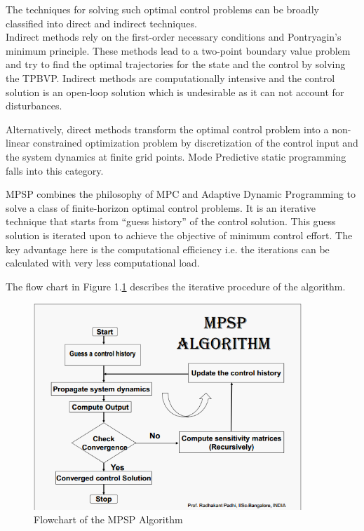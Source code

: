 \documentclass[12pt]{article}
\begin{document}
The techniques for solving such optimal control problems can be broadly classified into direct and indirect techniques.\\

Indirect methods rely on the first-order necessary conditions and Pontryagin's minimum principle. These methods lead to a two-point boundary value problem and try to find the optimal trajectories for the state and the control by solving the TPBVP. Indirect methods are computationally intensive and the control solution is an open-loop solution which is undesirable as it can not account for disturbances.

Alternatively, direct methods transform the optimal control problem into a non-linear constrained optimization problem by discretization of the control input and the system dynamics at finite grid points. Mode Predictive static programming falls into this category.


MPSP combines the philosophy of MPC and Adaptive Dynamic Programming to solve a class of finite-horizon optimal control problems. It is an iterative technique that starts from “guess history” of the control solution. This guess solution is iterated upon to achieve the objective of minimum control effort. The key advantage here is the computational efficiency i.e. the iterations can be calculated with very less computational load. 

The flow chart in Figure 1.\ref{fig:MPSPFlowchart} describes the iterative procedure of the algorithm.


\begin{figure}[h]
    \centering
    \includegraphics[width=0.9\textwidth]{img/MPSPFlowchart.png}
    \caption{Flowchart of the MPSP Algorithm}
    \label{fig:MPSPFlowchart}
\end{figure}
\end{document}
